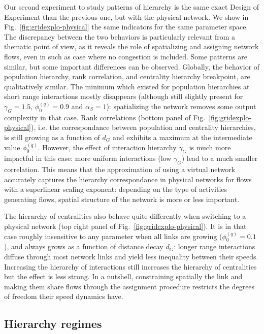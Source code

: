\documentclass[11pt]{article}
\begin{document}
Our second experiment to study patterns of hierarchy is the same exact Design of Experiment than the previous one, but with the physical network. We show in Fig.~\ref{fig:gridexplo-physical} the same indicators for the same parameter space. The discrepancy between the two behaviors is particularly relevant from a thematic point of view, as it reveals the role of spatializing and assigning network flows, even in such as case where no congestion is included. Some patterns are similar, but some important differences can be observed. Globally, the behavior of population hierarchy, rank correlation, and centrality hierarchy breakpoint, are qualitatively similar. The minimum which existed for population hierarchies at short range interactions mostly disappears (although still slightly present for $\gamma_G = 1.5$, $\phi_0^{(q)} = 0.9$ and $\alpha_S = 1$): spatializing the network removes some output complexity in that case. Rank correlations (bottom panel of Fig.~\ref{fig:gridexplo-physical}), i.e. the correspondance between population and centrality hierarchies, is still growing as a function of $d_G$ and exhibits a maximum at the intermediate value $\phi_0^{(q)}$. However, the effect of interaction hierarchy $\gamma_G$ is much more impactful in this case: more uniform interactions (low $\gamma_G$) lead to a much smaller correlation. This means that the approximation of using a virtual network accurately captures the hierarchy correspondance in physical networks for flows with a superlinear scaling exponent: depending on the type of activities generating flows, spatial structure of the network is more or less important. 

The hierarchy of centralities also behave quite differently when switching to a physical network (top right panel of Fig.~\ref{fig:gridexplo-physical}). It is in that case roughly insensitive to any parameter when all links are growing ($\phi_0^{(q)} = 0.1$), and always grows as a function of distance decay $d_G$: longer range interactions diffuse through most network links and yield less inequality between their speeds. Increasing the hierarchy of interactions still increases the hierarchy of centralities but the effect is less strong. In a nutshell, constraining spatially the link and making them share flows through the assignment procedure restricts the degrees of freedom their speed dynamics have.





\subsection{Hierarchy regimes}
\end{document}
